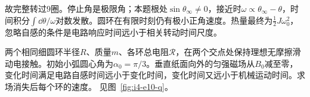 \begin{solution}
故完整转过$\boxed{9\text{圈}}$。停止角是极限角；本题根处$\sin\theta_\infty\ne0$，接近时$\omega\propto\theta_\infty-\theta$，时间积分$\int\dd\theta/\omega$对数发散。圆环在有限时刻仍有极小正角速度。热量最终为$\tfrac12J\omega_0^2$，忽略自感的条件是电路响应时间远小于相关转动时间尺度。
\end{solution}

\begin{example}[相交导电圆环中的短时磁冲量]\label{ex:i4-e10}

两个相同细圆环半径$R$、质量$m$、各环总电阻$\mathcal R$，在两个交点处保持理想无摩擦滑动电接触。初始小弧圆心角为$\alpha_0=\pi/3$。垂直纸面向外的匀强磁场从$B_0$减至零，变化时间满足电路自感时间远小于变化时间，变化时间又远小于机械运动时间。求场消失后每个环的速度。
 见图~\ref{fig:i4-e10-q}。
\end{example}

